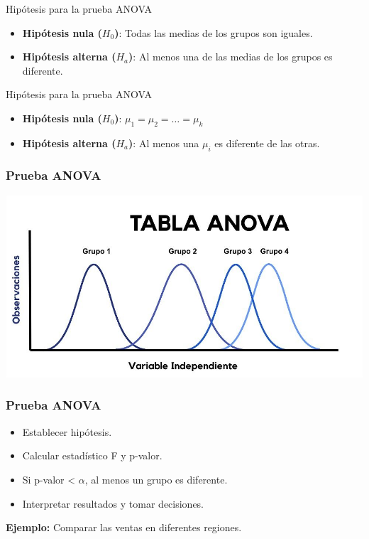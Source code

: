 \documentclass[aspectratio=169]{beamer}
\begin{document}
\begin{frame}{Hipótesis para la prueba ANOVA}
\begin{itemize}
    \item \textbf{Hipótesis nula (\(H_0\))}: Todas las medias de los grupos son iguales.
    \item \textbf{Hipótesis alterna (\(H_a\))}: Al menos una de las medias de los grupos es diferente.
\end{itemize}
\end{frame}

\begin{frame}{Hipótesis para la prueba ANOVA}
\begin{itemize}
    \item \textbf{Hipótesis nula (\(H_0\))}: \( \mu_1 = \mu_2 = \ldots = \mu_k \)
    \item \textbf{Hipótesis alterna (\(H_a\))}: Al menos una \( \mu_i \) es diferente de las otras.
\end{itemize}
\end{frame}




\begin{frame}
\frametitle{Prueba ANOVA}
\begin{center}
\includegraphics[width=0.8\linewidth]{Figuras/tabla-anova-spss.jpg} %
\end{center}
\end{frame}




\begin{frame}
    \frametitle{Prueba ANOVA}
    \begin{itemize}
        \item Establecer hipótesis.
        \item Calcular estadístico F y p-valor.
        \item Si p-valor < \(\alpha\), al menos un grupo es diferente.
        \item Interpretar resultados y tomar decisiones.
    \end{itemize}

\vfill

    
    \textbf{Ejemplo:} Comparar las ventas en diferentes regiones.
\end{frame}
\end{document}
